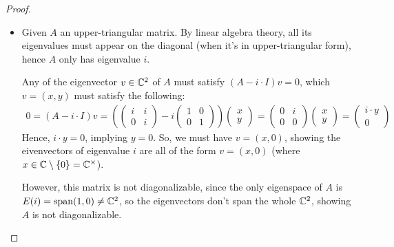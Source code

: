 \documentclass{article}
\begin{document}
\begin{proof}
    
    \hfil

    \begin{itemize}
        \item[1.] Given $A$ an upper-triangular matrix. By linear algebra theory, all its eigenvalues must appear on the diagonal (when it's in upper-triangular form), hence $A$ only has eigenvalue $i$. 
        
        Any of the eigenvector $v\in\mathbb{C}^2$ of $A$ must satisfy $(A-i \cdot I)v=0$, which $v=(x,y)$ must satisfy the following:
        \begin{align}
            0=(A-i\cdot I)v = \left(\begin{pmatrix}
                i & i\\0 & i
            \end{pmatrix} - i\begin{pmatrix}
                1&0\\0&1
            \end{pmatrix}\right)\begin{pmatrix}
                x\\y
            \end{pmatrix} = \begin{pmatrix}
                0&i\\0&0
            \end{pmatrix}\begin{pmatrix}
                x\\y
            \end{pmatrix} = \begin{pmatrix}
                i\cdot y\\0
            \end{pmatrix}
        \end{align}
        Hence, $i\cdot y=0$, implying $y=0$. So, we must have $v=(x,0)$, showing the eivenvectors of eigenvalue $i$ are all of the form $v=(x,0)$ (where $x\in\mathbb{C}\setminus\{0\} = \mathbb{C}^\times$).

        However, this matrix is not diagonalizable, since the only eigenspace of $A$ is $E(i) = \textmd{span}{(1,0)} \neq \mathbb{C}^2$, so the eigenvectors don't span the whole $\mathbb{C}^2$, showing $A$ is not diagonalizable.

        \hfil


\end{itemize}
\end{proof}
\end{document}
